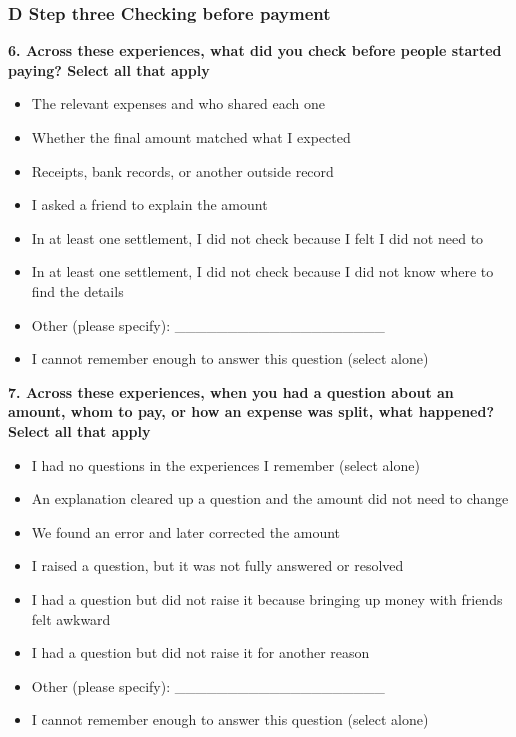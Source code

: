 \subsubsection*{D Step three Checking before payment}

\par\smallskip\noindent\textbf{6. Across these experiences, what did you check before people started paying? Select all that apply}\par\nobreak

\begin{itemize}
\item
  The relevant expenses and who shared each one
\item
  Whether the final amount matched what I expected
\item
  Receipts, bank records, or another outside record
\item
  I asked a friend to explain the amount
\item
  In at least one settlement, I did not check because I felt I did not need to
\item
  In at least one settlement, I did not check because I did not know where to find the details
\item
  Other (please specify): \_\_\_\_\_\_\_\_\_\_\_\_\_\_\_\_\_\_\_\_
\item
  I cannot remember enough to answer this question (select alone)
\end{itemize}

\par\smallskip\noindent\textbf{7. Across these experiences, when you had a question about an amount, whom to pay, or how an expense was split, what happened? Select all that apply}\par\nobreak

\begin{itemize}
\item
  I had no questions in the experiences I remember (select alone)
\item
  An explanation cleared up a question and the amount did not need to change
\item
  We found an error and later corrected the amount
\item
  I raised a question, but it was not fully answered or resolved
\item
  I had a question but did not raise it because bringing up money with friends felt awkward
\item
  I had a question but did not raise it for another reason
\item
  Other (please specify): \_\_\_\_\_\_\_\_\_\_\_\_\_\_\_\_\_\_\_\_
\item
  I cannot remember enough to answer this question (select alone)
\end{itemize}

